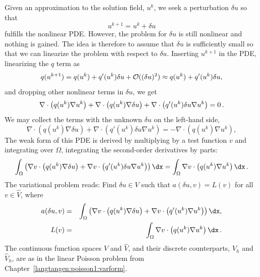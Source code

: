 Given an approximation to the solution field, $u^k$, we seek a
perturbation $\delta u$ so that
\begin{equation}
u^{k+1} = u^k + \delta u
\end{equation}
fulfills the nonlinear PDE.
However, the problem for $\delta u$ is still nonlinear and nothing is
gained. The idea is therefore to assume that $\delta u$ is sufficiently
small so that we can linearize the problem with respect to $\delta u$.
Inserting $u^{k+1}$ in the PDE,
linearizing the $q$ term as
\begin{equation}
q(u^{k+1}) = q(u^k) + q'(u^k)\delta u + {\cal O}((\delta u)^2)
\approx q(u^k) + q'(u^k)\delta u,
\end{equation}
and dropping other nonlinear terms in $\delta u$,
we get
\[
\nabla\cdot\left( q(u^k)\nabla u^k\right) +
\nabla\cdot\left( q(u^k)\nabla\delta u\right) +
\nabla\cdot\left( q'(u^k)\delta u\nabla u^k\right) = 0\thinspace .
\]
We may collect the terms with the unknown $\delta u$ on the left-hand side,
\begin{equation}
\nabla\cdot\left( q(u^k)\nabla\delta u\right) +
\nabla\cdot\left( q'(u^k)\delta u\nabla u^k\right) =
-\nabla\cdot\left( q(u^k)\nabla u^k\right),
\end{equation}
The weak form of this PDE is derived by multiplying by a test function $v$
and integrating over $\Omega$, integrating the second-order derivatives
by parts:
\begin{equation}
\int_\Omega \left(
\nabla v\cdot \left( q(u^k)\nabla\delta u\right)
+ \nabla v\cdot \left( q'(u^k)\delta u\nabla u^k\right)\right)\dx
= \int_\Omega\nabla v\cdot\left( q(u^k)\nabla u^k\right)\dx\langtangenep
\end{equation}
The variational problem reads: Find $\delta u\in V$ such that
$a(\delta u,v) = L(v)$ for all $v\in \hat V$, where
\begin{eqnarray}
a(\delta u,v) &=&
\int_\Omega \left(
\nabla v\cdot \left( q(u^k)\nabla\delta u\right)
+ \nabla v\cdot \left( q'(u^k)\nabla u^k\right)\right)\dx,\\
\label{langtangen:nonlinear:poisson:pdelevel:eq1}
L(v) &=&
\int_\Omega\nabla v\cdot\left( q(u^k)\nabla u^k\right)\dx\langtangenep
\label{langtangen:nonlinear:poisson:pdelevel:eq2}
\end{eqnarray}
The continuous function spaces $V$ and $\hat V$, and their discrete
counterparts, $V_h$ and $\hat V_h$, are as in the
linear Poisson problem from Chapter~\ref{langtangen:poisson1:varform}.

